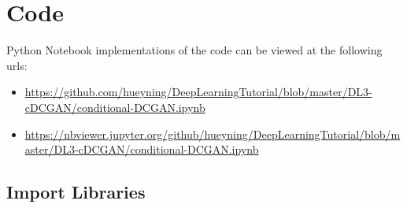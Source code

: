 \documentclass[11pt]{article}
\begin{document}
\newpage
    \section{Code}\label{code}
    
Python Notebook implementations of the code can be viewed at the following urls:

\begin{itemize}
\item
\url{https://github.com/hueyning/DeepLearningTutorial/blob/master/DL3-cDCGAN/conditional-DCGAN.ipynb}

\item
\url{https://nbviewer.jupyter.org/github/hueyning/DeepLearningTutorial/blob/master/DL3-cDCGAN/conditional-DCGAN.ipynb}
\end{itemize}

    \subsection*{Import Libraries}\label{import-libraries}
\end{document}
